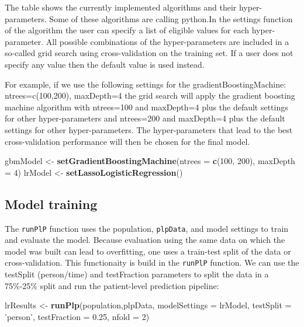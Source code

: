 \documentclass[]{article}
\newenvironment{Shaded}{\begin{snugshade}}{\end{snugshade}}
\newcommand{\KeywordTok}[1]{\textcolor[rgb]{0.13,0.29,0.53}{\textbf{#1}}}
\newcommand{\DataTypeTok}[1]{\textcolor[rgb]{0.13,0.29,0.53}{#1}}
\newcommand{\DecValTok}[1]{\textcolor[rgb]{0.00,0.00,0.81}{#1}}
\newcommand{\FloatTok}[1]{\textcolor[rgb]{0.00,0.00,0.81}{#1}}
\newcommand{\StringTok}[1]{\textcolor[rgb]{0.31,0.60,0.02}{#1}}
\newcommand{\NormalTok}[1]{#1}
\begin{document}
The table shows the currently implemented algorithms and their
hyper-parameters. Some of these algorithms are calling python.In the
settings function of the algorithm the user can specify a list of
eligible values for each hyper-parameter. All possible combinations of
the hyper-parameters are included in a so-called grid search using
cross-validation on the training set. If a user does not specify any
value then the default value is used instead.

For example, if we use the following settings for the
gradientBoostingMachine: ntrees=c(100,200), maxDepth=4 the grid search
will apply the gradient boosting machine algorithm with ntrees=100 and
maxDepth=4 plus the default settings for other hyper-parameters and
ntrees=200 and maxDepth=4 plus the default settings for other
hyper-parameters. The hyper-parameters that lead to the best
cross-validation performance will then be chosen for the final model.

\begin{Shaded}
\begin{Highlighting}[]
\NormalTok{gbmModel <-}\StringTok{ }\KeywordTok{setGradientBoostingMachine}\NormalTok{(}\DataTypeTok{ntrees =} \KeywordTok{c}\NormalTok{(}\DecValTok{100}\NormalTok{, }\DecValTok{200}\NormalTok{), }\DataTypeTok{maxDepth =} \DecValTok{4}\NormalTok{)}
\NormalTok{lrModel <-}\StringTok{ }\KeywordTok{setLassoLogisticRegression}\NormalTok{()}
\end{Highlighting}
\end{Shaded}

\subsection{Model training}\label{model-training}

The \texttt{runPlP} function uses the population, \texttt{plpData}, and
model settings to train and evaluate the model. Because evaluation using
the same data on which the model was built can lead to overfitting, one
uses a train-test split of the data or cross-validation. This
functionaity is build in the \texttt{runPlP} function. We can use the
testSplit (person/time) and testFraction parameters to split the data in
a 75\%-25\% split and run the patient-level prediction pipeline:

\begin{Shaded}
\begin{Highlighting}[]
\NormalTok{lrResults <-}\StringTok{ }\KeywordTok{runPlp}\NormalTok{(population,plpData, }\DataTypeTok{modelSettings =}\NormalTok{ lrModel, }\DataTypeTok{testSplit =} \StringTok{'person'}\NormalTok{,  }
\DataTypeTok{testFraction =} \FloatTok{0.25}\NormalTok{, }\DataTypeTok{nfold =} \DecValTok{2}\NormalTok{)}
\end{Highlighting}
\end{Shaded}
\end{document}
